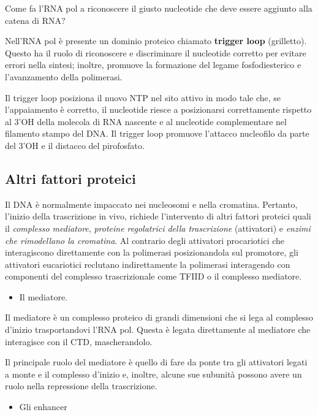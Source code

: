 \documentclass[11pt]{book}
\begin{document}
Come fa l'RNA pol a riconoscere il giusto nucleotide che deve essere
aggiunto alla catena di RNA?

Nell'RNA pol è presente un dominio proteico chiamato \textbf{trigger
loop} (grilletto). Questo ha il ruolo di riconoscere e discriminare il
nucleotide corretto per evitare errori nella sintesi; inoltre, promuove
la formazione del legame fosfodiesterico e l'avanzamento della
polimerasi.

Il trigger loop posiziona il nuovo NTP nel sito attivo in modo tale che,
se l'appaiamento è corretto, il nucleotide riesce a posizionarsi
correttamente rispetto al 3'OH della molecola di RNA nascente e al
nucleotide complementare nel filamento stampo del DNA. Il trigger loop
promuove l'attacco nucleofilo da parte del 3'OH e il distacco del
pirofosfato.

\subsection{Altri fattori proteici}\label{altri-fattori-proteici}

Il DNA è normalmente impaccato nei nucleosomi e nella cromatina.
Pertanto, l'inizio della trascrizione in vivo, richiede l'intervento di
altri fattori proteici quali il \emph{complesso mediatore},
\emph{proteine regolatrici della trascrizione} (attivatori) e
\emph{enzimi che rimodellano la cromatina}. Al contrario degli
attivatori procariotici che interagiscono direttamente con la polimerasi
posizionandola sul promotore, gli attivatori eucariotici reclutano
indirettamente la polimerasi interagendo con componenti del complesso
trascrizionale come TFIID o il complesso mediatore.

\begin{itemize}
\itemsep1pt\parskip0pt
\item
  Il mediatore.
\end{itemize}

Il mediatore è un complesso proteico di grandi dimensioni che si lega al
complesso d'inizio trasportandovi l'RNA pol. Questa è legata
direttamente al mediatore che interagisce con il CTD, mascherandolo.

Il principale ruolo del mediatore è quello di fare da ponte tra gli
attivatori legati a monte e il complesso d'inizio e, inoltre, alcune sue
subunità possono avere un ruolo nella repressione della trascrizione.

\begin{itemize}
\itemsep1pt\parskip0pt
\item
  Gli enhancer
\end{itemize}
\end{document}
